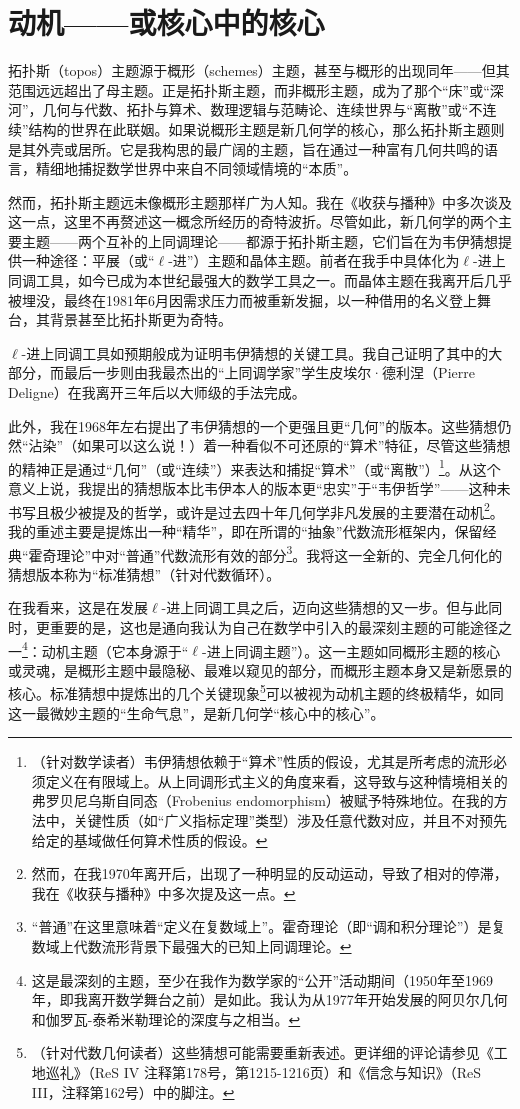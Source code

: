 \section{动机——或核心中的核心}

拓扑斯（topos）主题源于概形（schemes）主题，甚至与概形的出现同年——但其范围远远超出了母主题。正是拓扑斯主题，而非概形主题，成为了那个“床”或“深河”，几何与代数、拓扑与算术、数理逻辑与范畴论、连续世界与“离散”或“不连续”结构的世界在此联姻。如果说概形主题是新几何学的核心，那么拓扑斯主题则是其外壳或居所。它是我构思的最广阔的主题，旨在通过一种富有几何共鸣的语言，精细地捕捉数学世界中来自不同领域情境的“本质”。

然而，拓扑斯主题远未像概形主题那样广为人知。我在《收获与播种》中多次谈及这一点，这里不再赘述这一概念所经历的奇特波折。尽管如此，新几何学的两个主要主题——两个互补的上同调理论——都源于拓扑斯主题，它们旨在为韦伊猜想提供一种途径：平展（或“$\ell$-进”）主题和晶体主题。前者在我手中具体化为$\ell$-进上同调工具，如今已成为本世纪最强大的数学工具之一。而晶体主题在我离开后几乎被埋没，最终在1981年6月因需求压力而被重新发掘，以一种借用的名义登上舞台，其背景甚至比拓扑斯更为奇特。

$\ell$-进上同调工具如预期般成为证明韦伊猜想的关键工具。我自己证明了其中的大部分，而最后一步则由我最杰出的“上同调学家”学生皮埃尔·德利涅（Pierre Deligne）在我离开三年后以大师级的手法完成。

此外，我在1968年左右提出了韦伊猜想的一个更强且更“几何”的版本。这些猜想仍然“沾染”（如果可以这么说！）着一种看似不可还原的“算术”特征，尽管这些猜想的精神正是通过“几何”（或“连续”）来表达和捕捉“算术”（或“离散”）\footnote{（针对数学读者）韦伊猜想依赖于“算术”性质的假设，尤其是所考虑的流形必须定义在有限域上。从上同调形式主义的角度来看，这导致与这种情境相关的弗罗贝尼乌斯自同态（Frobenius endomorphism）被赋予特殊地位。在我的方法中，关键性质（如“广义指标定理”类型）涉及任意代数对应，并且不对预先给定的基域做任何算术性质的假设。}。从这个意义上说，我提出的猜想版本比韦伊本人的版本更“忠实”于“韦伊哲学”——这种未书写且极少被提及的哲学，或许是过去四十年几何学非凡发展的主要潜在动机\footnote{然而，在我1970年离开后，出现了一种明显的反动运动，导致了相对的停滞，我在《收获与播种》中多次提及这一点。}。我的重述主要是提炼出一种“精华”，即在所谓的“抽象”代数流形框架内，保留经典“霍奇理论”中对“普通”代数流形有效的部分\footnote{“普通”在这里意味着“定义在复数域上”。霍奇理论（即“调和积分理论”）是复数域上代数流形背景下最强大的已知上同调理论。}。我将这一全新的、完全几何化的猜想版本称为“标准猜想”（针对代数循环）。

在我看来，这是在发展$\ell$-进上同调工具之后，迈向这些猜想的又一步。但与此同时，更重要的是，这也是通向我认为自己在数学中引入的最深刻主题的可能途径之一\footnote{这是最深刻的主题，至少在我作为数学家的“公开”活动期间（1950年至1969年，即我离开数学舞台之前）是如此。我认为从1977年开始发展的阿贝尔几何和伽罗瓦-泰希米勒理论的深度与之相当。}：动机主题（它本身源于“$\ell$-进上同调主题”）。这一主题如同概形主题的核心或灵魂，是概形主题中最隐秘、最难以窥见的部分，而概形主题本身又是新愿景的核心。标准猜想中提炼出的几个关键现象\footnote{（针对代数几何读者）这些猜想可能需要重新表述。更详细的评论请参见《工地巡礼》（ReS IV 注释第178号，第1215-1216页）和《信念与知识》（ReS III，注释第162号）中的脚注。}可以被视为动机主题的终极精华，如同这一最微妙主题的“生命气息”，是新几何学“核心中的核心”。

